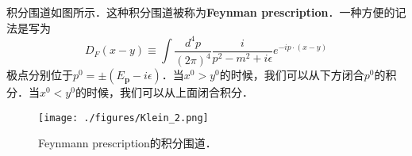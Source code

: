 积分围道如图所示．这种积分围道被称为\textbf{Feynman prescription}．一种方便的记法是写为
\begin{equation}
D_F(x-y) \equiv \int \frac{d^4p}{(2\pi)^4} \frac{i}{p^2-m^2+i\epsilon} e^{-ip\cdot(x-y)}
\end{equation}
极点分别位于$p^0 = \pm(E_{\mathbf p}-i\epsilon)$．当$x^0>y^0$的时候，我们可以从下方闭合$p^0$的积分．当$x^0<y^0$的时候，我们可以从上面闭合积分．
\begin{figure}[ht]
\centering
\texttt{[image: ./figures/Klein\_2.png]}
\caption{Feynmann prescription的积分围道．} \label{Klein_fig2}
\end{figure}


